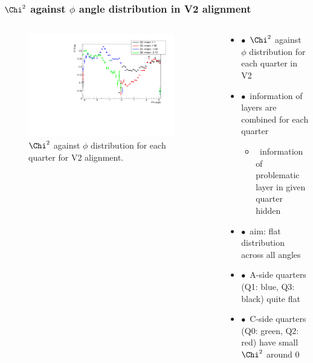 \documentclass[aspectratio=1610, 12pt]{beamer}
\begin{document}
\begin{frame}\frametitle{$\Chi^2$ against $\phi$ angle distribution in V2 alignment}
  \begin{columns}
    \begin{column}[c]{0.48\textwidth}
      \begin{figure}
        \centering
        \includegraphics[width=0.9\textwidth]{compareHitNums/chi2ProbVsPhi_RMSResidualQuarters_v2.pdf}
        \caption{$\Chi^2$ against $\phi$ distribution for each quarter for V2 alignment.}
      \end{figure}
    \end{column}
    \begin{column}[c]{0.48\textwidth}
      \begin{itemize}
        \item $\bullet$\, $\Chi^2$ against $\phi$ distribution for each quarter in V2
        \item $\bullet$\, information of layers are combined for each quarter
        \begin{itemize}
          \item \to\, information of problematic layer in given quarter hidden
        \end{itemize}
        \item $\bullet$\, aim: flat distribution across all angles
        \item $\bullet$\, A-side quarters (Q1: blue, Q3: black) quite flat
        \item $\bullet$\, C-side quarters (Q0: green, Q2: red) have small $\Chi^2$ around 0
      \end{itemize}
    \end{column}
  \end{columns}
\end{frame}
\end{document}
